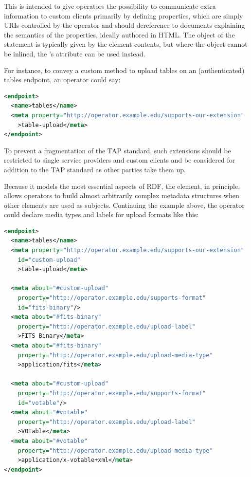 \documentclass{ivoa}
\begin{document}
\begin{generated}
\begin{bigdescription}
\end{bigdescription}\endgroup

\endgroup
\end{generated}


This is intended to give operators the possibility to communicate extra
information to custom clients primarily by defining properties, which
are simply URIs controlled by the operator and should dereference to
documents explaining the semantics of the properties, ideally authored
in HTML.  The object of the statement is typically given by the element
contents, but where the object cannot be inlined, the 's
 attribute can be used instead.

For instance, to convey a custom method to upload tables on an
(authenticated) tables endpoint, an operator could say:

\begin{lstlisting}[language=XML, basicstyle=\footnotesize]
<endpoint>
  <name>tables</name>
  <meta property="http://operator.example.edu/supports-our-extension"
    >table-upload</meta>
</endpoint>
\end{lstlisting}

To prevent a fragmentation of the TAP standard, such extensions should
be restricted to single service providers and custom clients and be
considered for addition to the TAP standard as other parties take them
up.

Because it models the most essential aspects of RDF, the 
element, in principle, allows operators to build almost arbitrarily
complex metadata structures when other  elements are used as
subjects.  Continuing the example above, the operator could declare
media types and labels for upload formats like this:

\begin{lstlisting}[language=XML, basicstyle=\footnotesize]
<endpoint>
  <name>tables</name>
  <meta property="http://operator.example.edu/supports-our-extension"
    id="custom-upload"
    >table-upload</meta>

  <meta about="#custom-upload"
    property="http://operator.example.edu/supports-format"
    id="fits-binary"/>
  <meta about="#fits-binary"
    property="http://operator.example.edu/upload-label"
    >FITS Binary</meta>
  <meta about="#fits-binary"
    property="http://operator.example.edu/upload-media-type"
    >application/fits</meta>

  <meta about="#custom-upload"
    property="http://operator.example.edu/supports-format"
    id="votable"/>
  <meta about="#votable"
    property="http://operator.example.edu/upload-label"
    >VOTable</meta>
  <meta about="#votable"
    property="http://operator.example.edu/upload-media-type"
    >application/x-votable+xml</meta>
</endpoint>
\end{lstlisting}
\end{document}
